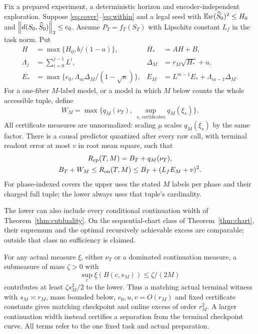 \begin{theorem}\label{thm:transfer}
Fix a prepared experiment, a deterministic horizon and encoder-independent exploration. Suppose \eqref{eq:cover}--\eqref{eq:within} and a legal seed with $\mathbb E w(\widehat S_0)^2\le H_0$ and $\left\lVert d(S_0,\widehat S_0)\right\rVert_2\le e_0$. Assume $P_T=f_T(S_T)$ with Lipschitz constant $L_f$ in the task norm. Put
\begin{align*}
 H&=\max\{H_0,b/(1-a)\},& H_*&=AH+B,\\
 \Lambda_j&=\sum_{i=0}^{j-1}L^i,& \Delta_M&=r_M\sqrt{H_*}+u,\\
 E_*&=\max\{e_0,\Lambda_m\Delta_M/(1-\sqrt\kappa)\},&
 E_M&=L^{m-1}E_*+\Lambda_{m-1}\Delta_M.
\end{align*}
For a one-fiber $M$-label model, or a model in which $M$ below counts the whole accessible tuple, define
\[
 W_M=\max\{q_M(\nu_T),\ \sup_{s,\,\text{certificates}}q_M(\xi_s)\}.
\]
All certificate measures are unnormalized: scaling $\underline\mu$ scales $q_M(\xi_s)$ by the same factor.
There is a causal predictor quantized after every raw call, with terminal readout error at most $v$ in root mean square, such that
\begin{equation}\label{eq:central}
 \begin{gathered}
 R_{\mathrm{cp}}(T,M)=B_T+q_M(\nu_T),\\
 B_T+W_M\le R_{\mathrm{on}}(T,M)
       \le B_T+(L_fE_M+v)^2.
 \end{gathered}
\end{equation}
For phase-indexed covers the upper uses the stated $M$ labels per phase and their charged full tuple; the lower always uses that tuple's cardinality.

The lower can also include every conditional continuation width of Theorem~\ref{thm:cutduality}. On the sequential-chart class of Theorem~\ref{thm:chart}, their supremum and the optimal recursively achievable excess are comparable; outside that class no sufficiency is claimed.

For any actual measure $\xi$, either $\nu_T$ or a dominated continuation measure, a submeasure of mass $\zeta>0$ with
\begin{equation}\label{eq:smallball}
 \sup_c\underline\xi(B(c,s_M))\le\zeta/(2M)
\end{equation}
contributes at least $\zeta s_M^2/2$ to the lower. Thus a matching actual terminal witness with $s_M\asymp r_M$, mass bounded below, $e_0,u,v=O(r_M)$ and fixed certificate constants gives matching checkpoint and online excess of order $r_M^2$. A larger continuation width instead certifies a separation from the terminal checkpoint curve. All terms refer to the one fixed task and actual preparation.
\end{theorem}
